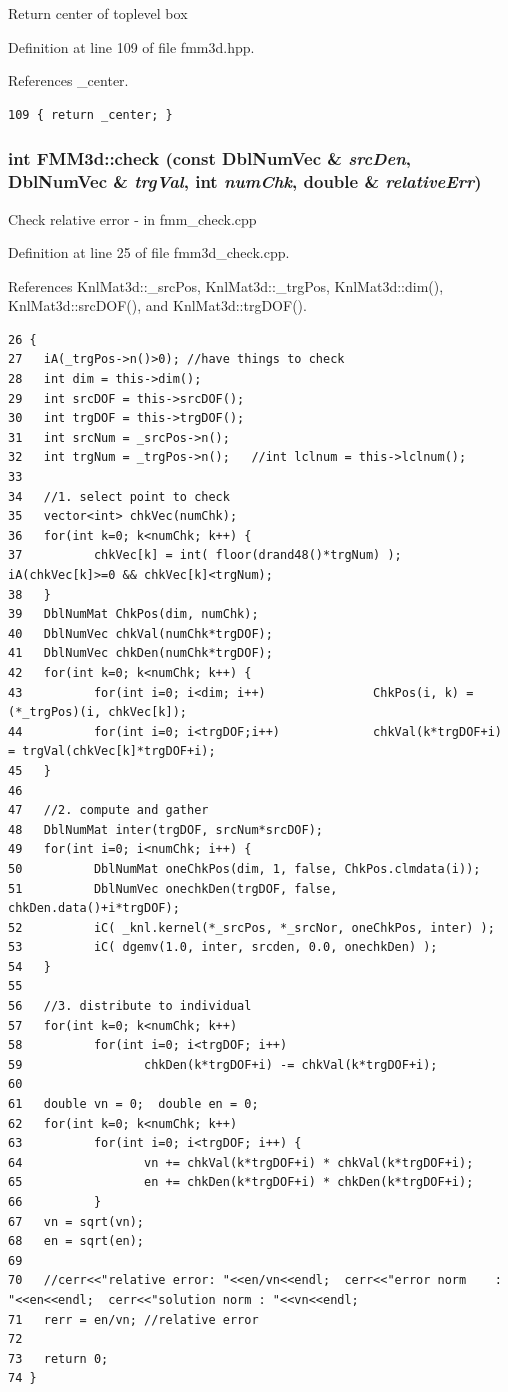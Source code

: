 Return center of toplevel box 

Definition at line 109 of file fmm3d.hpp.

References \_\-center.

\footnotesize\begin{verbatim}109 { return _center; }
\end{verbatim}\normalsize 


\subsubsection{\setlength{\rightskip}{0pt plus 5cm}int FMM3d::check (const Dbl\-Num\-Vec \& {\em src\-Den}, Dbl\-Num\-Vec \& {\em trg\-Val}, int {\em num\-Chk}, double \& {\em relative\-Err})}\label{classFMM3d_03ae26a8343213f8e305ed8df685173f_03ae26a8343213f8e305ed8df685173f}


Check relative error - in fmm\_\-check.cpp 

Definition at line 25 of file fmm3d\_\-check.cpp.

References Knl\-Mat3d::\_\-src\-Pos, Knl\-Mat3d::\_\-trg\-Pos, Knl\-Mat3d::dim(), Knl\-Mat3d::src\-DOF(), and Knl\-Mat3d::trg\-DOF().

\footnotesize\begin{verbatim}26 {
27   iA(_trgPos->n()>0); //have things to check
28   int dim = this->dim();
29   int srcDOF = this->srcDOF();
30   int trgDOF = this->trgDOF();
31   int srcNum = _srcPos->n();
32   int trgNum = _trgPos->n();   //int lclnum = this->lclnum();
33   
34   //1. select point to check
35   vector<int> chkVec(numChk);
36   for(int k=0; k<numChk; k++) {
37          chkVec[k] = int( floor(drand48()*trgNum) );     iA(chkVec[k]>=0 && chkVec[k]<trgNum);
38   }
39   DblNumMat ChkPos(dim, numChk);
40   DblNumVec chkVal(numChk*trgDOF);
41   DblNumVec chkDen(numChk*trgDOF);
42   for(int k=0; k<numChk; k++) {
43          for(int i=0; i<dim; i++)               ChkPos(i, k) = (*_trgPos)(i, chkVec[k]);
44          for(int i=0; i<trgDOF;i++)             chkVal(k*trgDOF+i) = trgVal(chkVec[k]*trgDOF+i);
45   }
46   
47   //2. compute and gather
48   DblNumMat inter(trgDOF, srcNum*srcDOF);
49   for(int i=0; i<numChk; i++) {
50          DblNumMat oneChkPos(dim, 1, false, ChkPos.clmdata(i));
51          DblNumVec onechkDen(trgDOF, false, chkDen.data()+i*trgDOF);
52          iC( _knl.kernel(*_srcPos, *_srcNor, oneChkPos, inter) );
53          iC( dgemv(1.0, inter, srcden, 0.0, onechkDen) );
54   }
55   
56   //3. distribute to individual
57   for(int k=0; k<numChk; k++)
58          for(int i=0; i<trgDOF; i++)
59                 chkDen(k*trgDOF+i) -= chkVal(k*trgDOF+i);
60   
61   double vn = 0;  double en = 0;
62   for(int k=0; k<numChk; k++)
63          for(int i=0; i<trgDOF; i++) {
64                 vn += chkVal(k*trgDOF+i) * chkVal(k*trgDOF+i);
65                 en += chkDen(k*trgDOF+i) * chkDen(k*trgDOF+i);
66          }
67   vn = sqrt(vn);
68   en = sqrt(en);
69   
70   //cerr<<"relative error: "<<en/vn<<endl;  cerr<<"error norm    : "<<en<<endl;  cerr<<"solution norm : "<<vn<<endl;
71   rerr = en/vn; //relative error
72   
73   return 0;
74 }
\end{verbatim}\normalsize 


